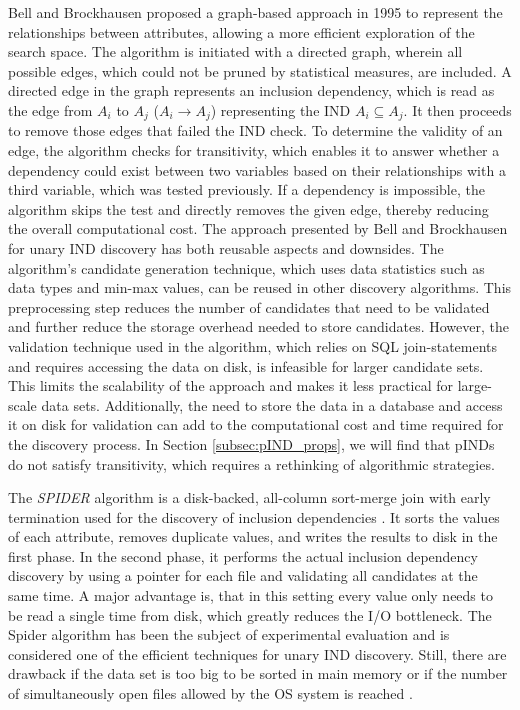 Bell and Brockhausen \cite{bell1995discovery} proposed a graph-based approach in 1995 to represent the relationships between attributes, allowing a more efficient exploration of the search space. The algorithm is initiated with a directed graph, wherein all possible edges, which could not be pruned by statistical measures, are included. A directed edge in the graph represents an inclusion dependency, which is read as the edge from $A_i$ to $A_j$ ($A_i \rightarrow A_j$) representing the IND $A_i \subseteq A_j$. It then proceeds to remove those edges that failed the IND check. To determine the validity of an edge, the algorithm checks for transitivity, which enables it to answer whether a dependency could exist between two variables based on their relationships with a third variable, which was tested previously. If a dependency is impossible, the algorithm skips the test and directly removes the given edge, thereby reducing the overall computational cost. The approach presented by Bell and Brockhausen for unary IND discovery has both reusable aspects and downsides. The algorithm's candidate generation technique, which uses data statistics such as data types and min-max values, can be reused in other discovery algorithms. This preprocessing step reduces the number of candidates that need to be validated and further reduce the storage overhead needed to store candidates. However, the validation technique used in the algorithm, which relies on SQL join-statements and requires accessing the data on disk, is infeasible for larger candidate sets. This limits the scalability of the approach and makes it less practical for large-scale data sets. Additionally, the need to store the data in a database and access it on disk for validation can add to the computational cost and time required for the discovery process. In Section \ref{subsec:pIND_props}, we will find that pINDs do not satisfy transitivity, which requires a rethinking of algorithmic strategies.

The \textit{SPIDER} algorithm is a disk-backed, all-column sort-merge join with early termination used for the discovery of inclusion dependencies \cite{bauckmann2006efficiently}. It sorts the values of each attribute, removes duplicate values, and writes the results to disk in the first phase. In the second phase, it performs the actual inclusion dependency discovery by using a pointer for each file and validating all candidates at the same time. A major advantage is, that in this setting every value only needs to be read a single time from disk, which greatly reduces the I/O bottleneck. The Spider algorithm has been the subject of experimental evaluation and is considered one of the efficient techniques for unary IND discovery. Still, there are drawback if the data set is too big to be sorted in main memory or if the number of simultaneously open files allowed by the OS system is reached \cite{papenbrock2015divide}.

